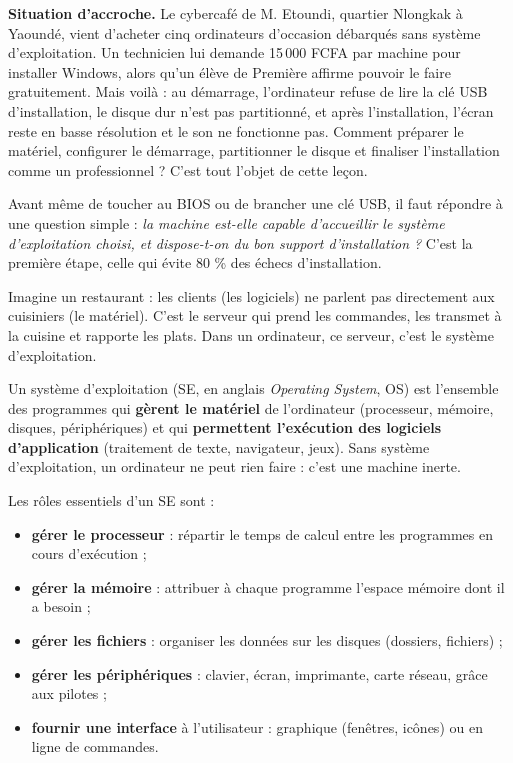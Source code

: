 \documentclass[11pt]{article}
\newcommand{\cle}[1]{{\popxbold\color{popdark}#1}}
\newcounter{popsec}
\newcounter{popsub}
\newcommand{\courssub}[1]{%
  \stepcounter{popsub}%
  \par\vspace{9pt}\noindent{\popxbold\fontsize{11.5}{13}\selectfont\color{popink}{\color{poporange}\thepopsec.\thepopsub}\hspace{6pt}#1}\par\nopagebreak\vspace{4pt}
}
\begin{document}
\textbf{Situation d'accroche.} Le cybercafé de M. Etoundi, quartier Nlongkak à Yaoundé, vient d'acheter cinq ordinateurs d'occasion débarqués sans système d'exploitation. Un technicien lui demande 15\,000 FCFA par machine pour installer Windows, alors qu'un élève de Première affirme pouvoir le faire gratuitement. Mais voilà : au démarrage, l'ordinateur refuse de lire la clé USB d'installation, le disque dur n'est pas partitionné, et après l'installation, l'écran reste en basse résolution et le son ne fonctionne pas. Comment préparer le matériel, configurer le démarrage, partitionner le disque et finaliser l'installation comme un professionnel ? C'est tout l'objet de cette leçon.

\medskip
Avant même de toucher au BIOS ou de brancher une clé USB, il faut répondre à une question simple : \emph{la machine est-elle capable d'accueillir le système d'exploitation choisi, et dispose-t-on du bon support d'installation ?} C'est la première étape, celle qui évite 80 \% des échecs d'installation.

\courssub{Qu'est-ce qu'un système d'exploitation ?}

Imagine un restaurant : les clients (les logiciels) ne parlent pas directement aux cuisiniers (le matériel). C'est le serveur qui prend les commandes, les transmet à la cuisine et rapporte les plats. Dans un ordinateur, ce serveur, c'est le \cle{système d'exploitation}.

\begin{definition}
Un \cle{système d'exploitation} (SE, en anglais \emph{Operating System}, OS) est l'ensemble des programmes qui \textbf{gèrent le matériel} de l'ordinateur (processeur, mémoire, disques, périphériques) et qui \textbf{permettent l'exécution des logiciels d'application} (traitement de texte, navigateur, jeux). Sans système d'exploitation, un ordinateur ne peut rien faire : c'est une machine inerte.
\end{definition}

Les rôles essentiels d'un SE sont :
\begin{itemize}
\item \textbf{gérer le processeur} : répartir le temps de calcul entre les programmes en cours d'exécution ;
\item \textbf{gérer la mémoire} : attribuer à chaque programme l'espace mémoire dont il a besoin ;
\item \textbf{gérer les fichiers} : organiser les données sur les disques (dossiers, fichiers) ;
\item \textbf{gérer les périphériques} : clavier, écran, imprimante, carte réseau, grâce aux \cle{pilotes} ;
\item \textbf{fournir une interface} à l'utilisateur : graphique (fenêtres, icônes) ou en ligne de commandes.
\end{itemize}
\end{document}
